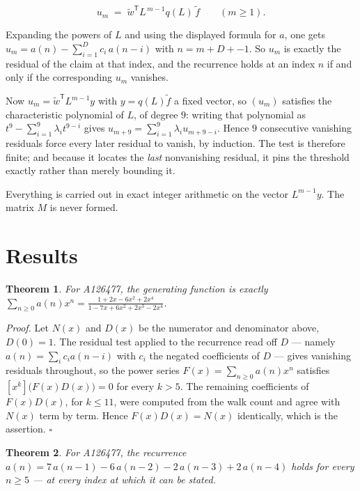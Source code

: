 \documentclass[11pt]{article}
\newtheorem{theorem}{Theorem}
\theoremstyle{definition}
\begin{document}
\[u_m \;=\; \tilde w^{\mathsf T} L^{\,m-1} q(L)\,\tilde f \qquad (m \ge 1).\]

Expanding the powers of $L$ and using the displayed formula for $a$, one gets $u_m = a(n) - \sum_{i=1}^{D} c_i\,a(n-i)$ with $n = m + D + -1$. So $u_m$ is exactly the residual of the claim at that index, and the recurrence holds at an index $n$ if and only if the corresponding $u_m$ vanishes.

Now $u_m = \tilde w^{\mathsf T} L^{m-1} y$ with $y = q(L)\tilde f$ a fixed vector, so $(u_m)$ satisfies the characteristic polynomial of $L$, of degree $9$: writing that polynomial as $t^{9} - \sum_{i=1}^{9} \lambda_i t^{9-i}$ gives $u_{m+9} = \sum_{i=1}^{9} \lambda_i u_{m+9-i}$. Hence $9$ consecutive vanishing residuals force every later residual to vanish, by induction. The test is therefore finite; and because it locates the {\itshape last} nonvanishing residual, it pins the threshold exactly rather than merely bounding it.

Everything is carried out in exact integer arithmetic on the vector $L^{m-1}y$. The matrix $M$ is never formed.

\section{Results}

\begin{theorem} For A126477, the generating function is exactly $\sum_{n\ge 0} a(n)x^n = \frac{1 + 2x - 6x^{2} + 2x^{4}}{1 - 7x + 6x^{2} + 2x^{3} - 2x^{4}}$.\end{theorem}

{\itshape Proof.} Let $N(x)$ and $D(x)$ be the numerator and denominator above, $D(0)=1$. The residual test applied to the recurrence read off $D$ --- namely $a(n) = \sum_i c_i a(n-i)$ with $c_i$ the negated coefficients of $D$ --- gives vanishing residuals throughout, so the power series $F(x)=\sum_{n\ge 0}a(n)x^n$ satisfies $[x^k]\bigl(F(x)D(x)\bigr) = 0$ for every $k > 5$. The remaining coefficients of $F(x)D(x)$, for $k \le 11$, were computed from the walk count and agree with $N(x)$ term by term. Hence $F(x)D(x) = N(x)$ identically, which is the assertion. $\square$

\begin{theorem} For A126477, the recurrence $a(n) = 7\,a(n-1) - 6\,a(n-2) - 2\,a(n-3) + 2\,a(n-4)$ holds for every $n \ge 5$ --- at every index at which it can be stated.\end{theorem}
\end{document}
